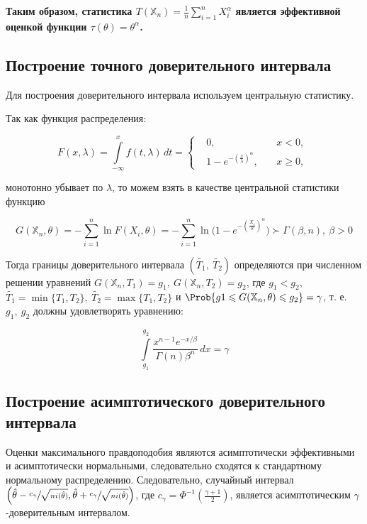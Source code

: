 \documentclass[12pt]{article}
\begin{document}
\begin{center}
\textbf{Таким образом, статистика $T(\mathbb{X}_n) = \frac{1}{n}\sum_{i=1}^n X_i^\alpha $ является эффективной оценкой функции $\tau(\theta) = \theta^\alpha$.}
\end{center}

\subsection{Построение точного доверительного интервала}

Для построения доверительного интервала используем центральную статистику.

Так как функция распределения:

$$
F(x, \lambda) = \int\limits_{-\infty}^{x} f(t, \lambda)\,dt = \left\{
\begin{aligned}
	&0,\ &&x < 0,\ \\
	&1-e^{-\left(\frac{x}{\lambda}\right)^\alpha},\  && x \geqslant 0,\
\end{aligned}\right.
$$

монотонно убывает по $\lambda$, то можем взять в качестве центральной статистики функцию

$$
	G(\mathbb{X}_n, \theta) = -\sum_{i=1}^n \ln F(X_i, \theta) = -\sum_{i=1}^n \ln \bigg(1-e^{-\left(\frac{X_i}{\theta}\right)^\alpha}\bigg) \succ \Gamma(\beta, n),\ \beta > 0
$$

Тогда границы доверительного интервала $(\tilde{T_1},\ \tilde{T_2})$ определяются при численном решении уравнений $G(\mathbb{X}_n, T_1) = g_1,\ G(\mathbb{X}_n, T_2) = g_2$, где $g_1 < g_2$, $\tilde{T_1} = \min\{T_1, T_2\},\ \tilde{T_2} = \max\{T_1, T_2\}$ и $\Prob\{g1\leqslant G(\mathbb{X}_n, \theta)\leqslant g_2\} = \gamma$, т. е. $g_1,\ g_2$ должны удовлетворять уравнению:

$$
\int\limits_{g_1}^{g_2} \frac{x^{n-1}e^{-x/\beta}}{\Gamma(n) \beta^n}\,dx = \gamma
$$

\subsection{Построение асимптотического доверительного интервала}
Оценки максимального правдоподобия являются асимптотически эффективными и асимптотически нормальными, следовательно сходятся к стандартному нормальному распределению. Следовательно, случайный интервал $
\left(
	\hat\theta - \sfrac{c_\gamma}{\sqrt{n i(\hat\theta)}}, 
	\hat\theta + \sfrac{c_\gamma}{\sqrt{n i(\hat\theta)}}
\right)
$, где $c_\gamma = \Phi^{-1}\left(\frac{\gamma+1}{2}\right)$, является асимптотическим $\gamma$-доверительным интервалом.
\end{document}
